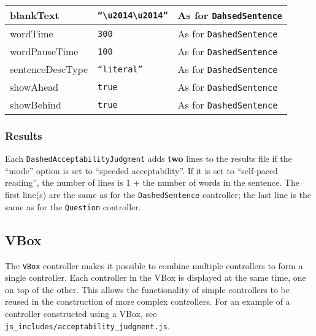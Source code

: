 \documentclass[11pt,letterpaper]{article}
\begin{document}
\begin{RaggedRight}
\begin{tabular}{|p{1.2181in}|p{1.4285in}|p{2.8534in}|}
\hline
 blankText         &  \texttt{``{\textbackslash}u2014{\textbackslash}u2014''}           &  As for \texttt{DahsedSentence}                              \\
\hline
 wordTime          &  \texttt{300}                      &  As for \texttt{DashedSentence}                              \\
\hline
 wordPauseTime     &  \texttt{100}                      &  As for \texttt{DashedSentence}                              \\
\hline
 sentenceDescType  &  \texttt{``literal''}                &  As for \texttt{DashedSentence}                              \\
\hline
 showAhead         &  \texttt{true}                     &  As for \texttt{DashedSentence}                              \\
\hline
 showBehind        &  \texttt{true}                     &  As for \texttt{DashedSentence}                              
\\\hline
\end{tabular}
\end{RaggedRight}
\fussy

\normalsize

\subsubsection*{Results}

Each \texttt{DashedAcceptabilityJudgment} adds \textbf{two} lines to the results
file if the ``mode'' option is set to ``speeded acceptability''. If it is
set to ``self-paced reading'', the number of lines is 1 + the number of
words in the sentence.  The first line(s) are the same as for the
\texttt{DashedSentence} controller; the last line is the same as for the
\texttt{Question} controller.

\subsection{VBox}

The \texttt{VBox} controller makes it possible to combine multiple controllers to form
a single controller. Each controller in the VBox is displayed at the same time,
one on top of the other. This allows the functionality of simple controllers to
be reused in the construction of more complex controllers. For an example of a
controller constructed using a VBox, see
\texttt{js\_includes/acceptability\_judgment.js}.
\end{document}
